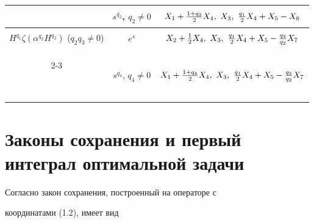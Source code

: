 \begin{center}
\begin{tabular}{|c|c|c|}
\ & $s^{q_2}$, $q_2\ne0$ & $\myrule X_1+\frac{1+q_2}{2}X_4,


\ X_3,\ \frac{q_1}{2}X_4+X_5-X_8$ \\


\hline


%


$H^{q_1}\zeta(\alpha^{q_2}H^{q_3})$ ($q_2q_3\ne0$) & $e^s$


& $\myrule X_2+\frac12 X_4,\ X_3,\ \frac{q_1}{2}X_4+


X_5-\frac{q_3}{q_2}X_7$ \\


\cline{2-3}


\ & $s^{q_4}$, $q_4\ne0$ & $\myrule X_1+\frac{1+q_4}{2}X_4,


\ X_3,\ \frac{q_1}{2}X_4+X_5-\frac{q_3}{q_2}X_7$ \\


\hline


\end{tabular} 


\end{center} 





\section{Законы сохранения и первый интеграл оптимальной задачи} 


 


Согласно \cite{3} закон сохранения, построенный на операторе с 


координатами (1.2), имеет вид 


